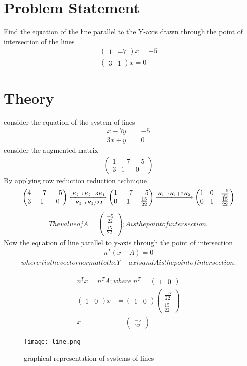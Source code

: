 \documentclass{article}
\newcommand{\myvec}[1]{\ensuremath{\begin{pmatrix}#1\end{pmatrix}}}
\begin{document}
\section{Problem Statement}
Find the equation of the line parallel to the Y-axis drawn through the point of intersection of the lines
\begin{align}
\myvec{1 & -7}x  =-5 \\ \myvec{3 & 1}x  = 0
\end{align}
\section{Theory}
consider the equation of the system of lines
\begin{align}
x - 7y & = -5 \\
3x + y & = 0
\end{align}
 consider the augmented matrix
 \begin{align}
 \myvec{1 & -7 & -5 \\ 3 & 1 & 0}
 \end{align}
 By applying row reduction reduction technique \\
 \begin{align}
\myvec{4 & -7 & -5\\ 3 & 1 & 0}
	\xleftrightarrow[R_2 \rightarrow R_2/22]{R_2 \rightarrow R_2-3R_1}
	\myvec{1 & -7 & -5 \\ 0 & 1 & \frac{15}{22}}
	\xrightarrow[]{R_1 \rightarrow R_1+7R_2}
	 \myvec{1 & 0 & \frac{-5}{22} \\ 0 & 1 & \frac{15}{22}}
 \end{align}
\begin{align}
The value of{A} = \myvec{\frac{-5}{22} \\ \frac{15}{22}} ;
{A} is the point of intersection.
\end{align}
Now the equation of line parallel to y-axis through the point of intersection\\
\begin{align}
{n}^T({x}-{A}) = 0
\end{align}
$$where \vec{n}  is the vector normal to the Y - axis and{A} is the point of intersection.$$\\
\begin{align*}
{{n}^T{x}} = {{n}^T{A}} ; where \;
{n}^T = \myvec{1 & 0}
 \end{align*}
 \begin{align}
\myvec{1 & 0}{x} &  = \myvec{1 & 0} \myvec{\frac{-5}{22} \\ \frac{15}{22}}\\
{x} & = \myvec{\frac{-5}{22}} 
 \end{align}
 \begin{figure}
 \centering
 \texttt{[image: line.png]}
 \caption{graphical representation of systems of lines}
 \end{figure}
\end{document}
